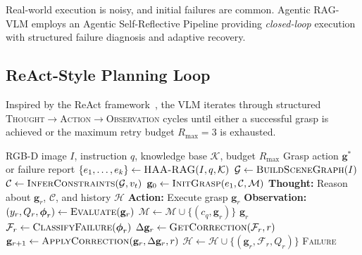 \documentclass[letterpaper, 10pt, conference]{ieeeconf}
\newcommand{\sysname}{Agentic RAG-VLM}
\begin{document}
Real-world execution is noisy, and initial failures are common.
\sysname{} employs an Agentic Self-Reflective Pipeline providing \emph{closed-loop} execution with structured failure diagnosis and adaptive recovery.

\subsection{ReAct-Style Planning Loop}
\label{sec:react}

Inspired by the ReAct framework~\cite{yao2023react}, the VLM iterates through structured \textsc{Thought}$\rightarrow$\textsc{Action}$\rightarrow$\textsc{Observation} cycles until either a successful grasp is achieved or the maximum retry budget $R_{\max} = 3$ is exhausted.

\begin{algorithm}[t]
\caption{Agentic Self-Reflective Grasp Planning}
\label{alg:agentic}
\begin{algorithmic}[1]
\REQUIRE RGB-D image $I$, instruction $q$, knowledge base $\mathcal{K}$, budget $R_{\max}$
\ENSURE Grasp action $\mathbf{g}^*$ or failure report
\STATE $\{e_1, \dots, e_k\} \leftarrow \textsc{HAA-RAG}(I, q, \mathcal{K})$ 
\STATE $\mathcal{G} \leftarrow \textsc{BuildSceneGraph}(I)$ 
\STATE $\mathcal{C} \leftarrow \textsc{InferConstraints}(\mathcal{G}, v_t)$ 
\STATE $\mathbf{g}_0 \leftarrow \textsc{InitGrasp}(e_1, \mathcal{C}, \mathcal{M})$ 
    \STATE \textbf{Thought:} Reason about $\mathbf{g}_r$, $\mathcal{C}$, and history $\mathcal{H}$
    \STATE \textbf{Action:} Execute grasp $\mathbf{g}_r$
    \STATE \textbf{Observation:} $(y_r, Q_r, \boldsymbol{\phi}_r) \leftarrow \textsc{Evaluate}(\mathbf{g}_r)$
        \STATE $\mathcal{M} \leftarrow \mathcal{M} \cup \{(c_q, \mathbf{g}_r)\}$ 
        \RETURN $\mathbf{g}_r$
    \ENDIF
    \STATE $\mathcal{F}_r \leftarrow \textsc{ClassifyFailure}(\boldsymbol{\phi}_r)$ 
    \STATE $\Delta\mathbf{g}_r \leftarrow \textsc{GetCorrection}(\mathcal{F}_r, r)$ 
    \STATE $\mathbf{g}_{r+1} \leftarrow \textsc{ApplyCorrection}(\mathbf{g}_r, \Delta\mathbf{g}_r, r)$
    \STATE $\mathcal{H} \leftarrow \mathcal{H} \cup \{(\mathbf{g}_r, \mathcal{F}_r, Q_r)\}$ 
\ENDFOR
\RETURN \textsc{Failure}
\end{algorithmic}
\end{algorithm}
\end{document}
